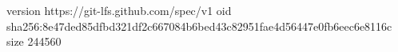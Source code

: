 version https://git-lfs.github.com/spec/v1
oid sha256:8e47ded85dfbd321df2c667084b6bed43c82951fae4d56447e0fb6eec6e8116c
size 244560
